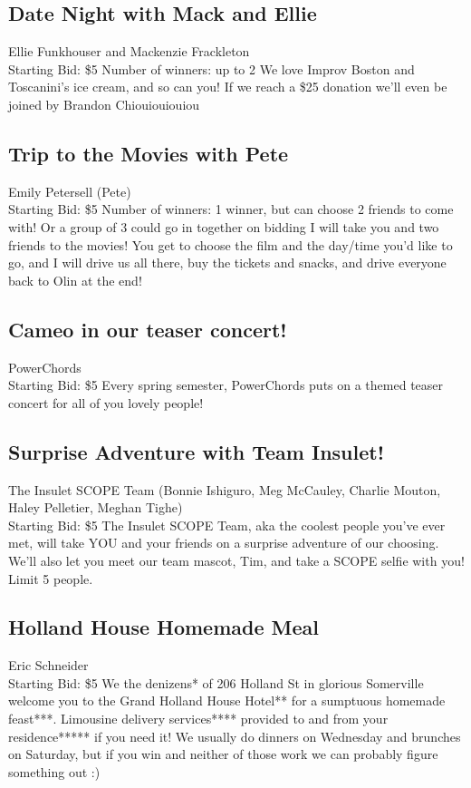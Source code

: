 \documentclass[11pt]{article}
\begin{document}
\subsection{Date Night with Mack and Ellie}
Ellie Funkhouser and Mackenzie Frackleton
\\
Starting Bid: \$5
\newline
Number of winners: up to 2
\newline
We love Improv Boston and Toscanini's ice cream, and so can you! If we reach a \$25 donation we'll even be joined by Brandon Chiouiouiouiou
\subsection{Trip to the Movies with Pete}
Emily Petersell (Pete)
\\
Starting Bid: \$5
\newline
Number of winners: 1 winner, but can choose 2 friends to come with! Or a group of 3 could go in together on bidding
\newline
I will take you and two friends to the movies! You get to choose the film and the day/time you'd like to go, and I will drive us all there, buy the tickets and snacks, and drive everyone back to Olin at the end!
\subsection{Cameo in our teaser concert!}
PowerChords
\\
Starting Bid: \$5
\newline
Every spring semester, PowerChords puts on a themed teaser concert for all of you lovely people!
\subsection{Surprise Adventure with Team Insulet!}
The Insulet SCOPE Team (Bonnie Ishiguro, Meg McCauley, Charlie Mouton, Haley Pelletier, Meghan Tighe)
\\
Starting Bid: \$5
\newline
The Insulet SCOPE Team, aka the coolest people you've ever met, will take YOU and your friends on a surprise adventure of our choosing. We'll also let you meet our team mascot, Tim, and take a SCOPE selfie with you! Limit 5 people.
\subsection{Holland House Homemade Meal}
Eric Schneider
\\
Starting Bid: \$5
\newline
We the denizens* of 206 Holland St in glorious Somerville welcome you to the Grand Holland House Hotel** for a sumptuous homemade feast***. Limousine delivery services**** provided to and from your residence***** if you need it! We usually do dinners on Wednesday and brunches on Saturday, but if you win and neither of those work we can probably figure something out :)
\end{document}
